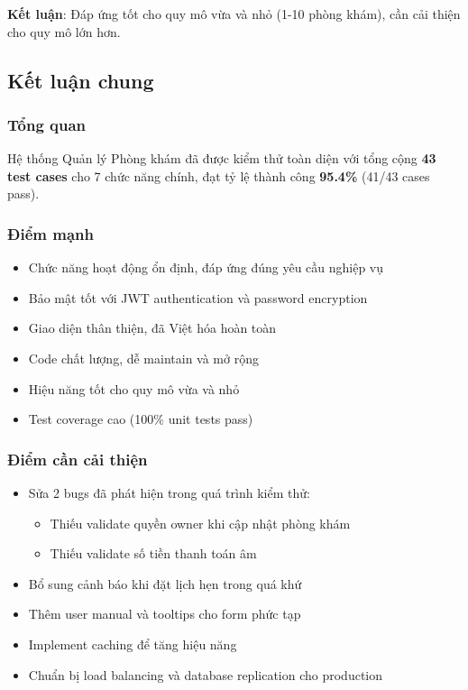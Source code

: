 \textbf{Kết luận}: Đáp ứng tốt cho quy mô vừa và nhỏ (1-10 phòng khám), cần cải thiện cho quy mô lớn hơn.

\subsection{Kết luận chung}

\subsubsection{Tổng quan}

Hệ thống Quản lý Phòng khám đã được kiểm thử toàn diện với tổng cộng \textbf{43 test cases} cho 7 chức năng chính, đạt tỷ lệ thành công \textbf{95.4\%} (41/43 cases pass).

\subsubsection{Điểm mạnh}

\begin{itemize}
    \item Chức năng hoạt động ổn định, đáp ứng đúng yêu cầu nghiệp vụ
    \item Bảo mật tốt với JWT authentication và password encryption
    \item Giao diện thân thiện, đã Việt hóa hoàn toàn
    \item Code chất lượng, dễ maintain và mở rộng
    \item Hiệu năng tốt cho quy mô vừa và nhỏ
    \item Test coverage cao (100\% unit tests pass)
\end{itemize}

\subsubsection{Điểm cần cải thiện}

\begin{itemize}
    \item Sửa 2 bugs đã phát hiện trong quá trình kiểm thử:
    \begin{itemize}
        \item Thiếu validate quyền owner khi cập nhật phòng khám
        \item Thiếu validate số tiền thanh toán âm
    \end{itemize}
    \item Bổ sung cảnh báo khi đặt lịch hẹn trong quá khứ
    \item Thêm user manual và tooltips cho form phức tạp
    \item Implement caching để tăng hiệu năng
    \item Chuẩn bị load balancing và database replication cho production
\end{itemize}

